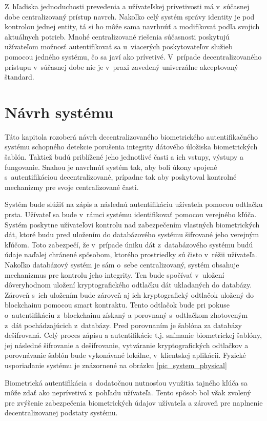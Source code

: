 Z~hľadiska jednoduchosti prevedenia a užívateľskej prívetivosti má v~súčasnej dobe centralizovaný prístup navrch. Nakoľko celý systém správy identity je pod kontrolou jednej entity, tá si ho môže sama navrhnúť a modifikovať podľa svojich aktuálnych potrieb. Mnohé centralizované riešenia súčasnosti poskytujú užívateľom možnosť autentifikovať sa u~viacerých poskytovateľov služieb pomocou jedného systému, čo sa javí ako prívetivé. V~prípade decentralizovaného prístupu v~súčasnej dobe nie je v~praxi zavedený univerzálne akceptovaný štandard. \cite{identity_comparison} 


\chapter{Návrh systému}
Táto kapitola rozoberá návrh decentralizovaného biometrického autentifikačného systému schopného detekcie porušenia integrity dátového úložiska biometrických šablón. Taktiež budú priblížené jeho jednotlivé časti a ich vstupy, výstupy a fungovanie. Snahou je navrhnúť systém tak, aby boli úkony spojené s~autentifikáciou decentralizované, prípadne tak aby poskytoval kontrolné mechanizmy pre svoje centralizované časti.

Systém bude slúžiť na zápis a následnú autentifikáciu užívateľa pomocou odtlačku prsta. Užívateľ sa bude v~rámci systému identifikovať pomocou verejného kľúča. Systém poskytne užívateľovi kontrolu nad zabezpečením vlastných biometrických dát, ktoré budu pred uložením do databázového systému šifrované jeho verejným kľúčom. Toto zabezpečí, že v~prípade úniku dát z~databázového systému budú údaje naďalej chránené spôsobom, ktorého prostriedky sú čisto v~réžii užívateľa. Nakoľko databázový systém je sám o~sebe centralizovaný, systém obsahuje mechanizmus pre kontrolu jeho integrity. Ten bude spočívať v~uložení dôveryhodnom uložení kryptografického odtlačku dát ukladaných do databázy. Zároveň s~ich uložením bude zároveň aj ich kryptografický odtlačok uložený do blockchainu pomocou smart kontraktu. Tento odtlačok bude pri pokuse o~autentifikáciu z~blockchainu získaný a porovnaný s~odtlačkom zhotoveným z~dát pochádzajúcich z~databázy. Pred porovnaním je šablóna za databázy dešifrovaná. Celý proces zápisu a autentifikácie t.j. snímanie biometrickej šablóny, jej následné šifrovanie a dešifrovanie, vytváranie kryptografických odtlačkov a porovnávanie šablón bude vykonávané lokálne, v~klientskej aplikácii. Fyzické usporiadanie systému je znázornené na obrázku \ref{pic_system_physical}

Biometrická autentifikácia s~dodatočnou nutnosťou využitia tajného kľúča sa môže zdať ako neprívetivá z~pohľadu užívateľa. Tento spôsob bol však zvolený pre zvýšenie zabezpečenia biometrických údajov užívateľa a zároveň pre naplnenie decentralizovanej podstaty systému.

